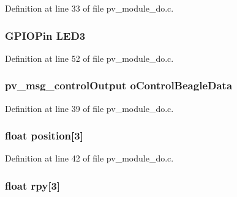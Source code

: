 Definition at line 33 of file pv\+\_\+module\+\_\+do.\+c.

\subsubsection[{\texorpdfstring{L\+E\+D3}{LED3}}]{\setlength{\rightskip}{0pt plus 5cm}G\+P\+I\+O\+Pin L\+E\+D3}\hypertarget{group__app__do_ga804d3aba22a782022afc3977966f2faa}{}\label{group__app__do_ga804d3aba22a782022afc3977966f2faa}


Definition at line 52 of file pv\+\_\+module\+\_\+do.\+c.

\subsubsection[{\texorpdfstring{o\+Control\+Beagle\+Data}{oControlBeagleData}}]{\setlength{\rightskip}{0pt plus 5cm}pv\+\_\+msg\+\_\+control\+Output o\+Control\+Beagle\+Data}\hypertarget{group__app__do_ga83a7ee8a519c421eec8b1c7efc9e0501}{}\label{group__app__do_ga83a7ee8a519c421eec8b1c7efc9e0501}


Definition at line 39 of file pv\+\_\+module\+\_\+do.\+c.

\subsubsection[{\texorpdfstring{position}{position}}]{\setlength{\rightskip}{0pt plus 5cm}float position\mbox{[}3\mbox{]}}\hypertarget{group__app__do_ga1a3ca0a0bf0cdb13a8689c0558ead4df}{}\label{group__app__do_ga1a3ca0a0bf0cdb13a8689c0558ead4df}


Definition at line 42 of file pv\+\_\+module\+\_\+do.\+c.

\subsubsection[{\texorpdfstring{rpy}{rpy}}]{\setlength{\rightskip}{0pt plus 5cm}float rpy\mbox{[}3\mbox{]}}\hypertarget{group__app__do_ga1ba0a7c98794a4cda502c52d222ab614}{}\label{group__app__do_ga1ba0a7c98794a4cda502c52d222ab614}


